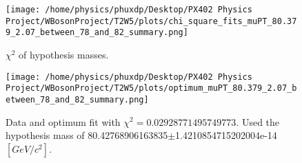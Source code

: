 \documentclass[12pt]{article}
\begin{document}
       \begin{figure}[tb]
		\centering
		\texttt{[image: /home/physics/phuxdp/Desktop/PX402 Physics Project/WBosonProject/T2W5/plots/chi\_square\_fits\_muPT\_80.379\_2.07\_between\_78\_and\_82\_summary.png]}
		\caption{\small $\chi^2$ of hypothesis masses. }
		\label{fig: fig_chi_square}
	\end{figure}

    \begin{figure}[tb]
		\centering
		\texttt{[image: /home/physics/phuxdp/Desktop/PX402 Physics Project/WBosonProject/T2W5/plots/optimum\_muPT\_80.379\_2.07\_between\_78\_and\_82\_summary.png]}
		\caption{\small Data and optimum fit with $\chi^2 = 0.02928771495749773$. Used the hypothesis mass of 80.42768906163835$\pm$1.4210854715202004e-14 $[GeV/c^{2}]$. }
		\label{fig: fig_optim_parms}
	\end{figure}
    
\end{document}
